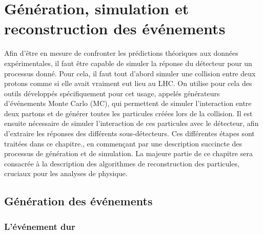 \chapter{Génération, simulation et reconstruction des événements} \label{chap:reco}

Afin d'être en mesure de confronter les prédictions théoriques aux données expérimentales, il faut être capable de simuler la réponse du détecteur pour un processus donné. Pour cela, il faut tout d'abord simuler une collision entre deux protons comme si elle avait vraiment eut lieu au LHC. On utilise pour cela des outils développés spécifiquement pour cet usage, appelés générateurs d'événements Monte Carlo (MC), qui permettent de simuler l'interaction entre deux partons et de générer toutes les particules créées lors de la collision. Il est ensuite nécessaire de simuler l'interaction de ces particules avec le détecteur, afin d'extraire les réponses des différents sous-détecteurs. Ces différentes étapes sont traitées dans ce chapitre., en commençant par une description succincte des processus de génération et de simulation. La majeure partie de ce chapitre sera consacrée à la description des algorithmes de reconstruction des particules, cruciaux pour les analyses de physique.

\section{Génération des événements}




\subsection{L'événement dur}

